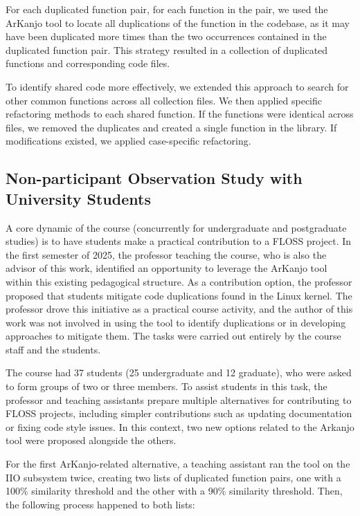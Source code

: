 For each duplicated function pair, for each function in the pair, we used the ArKanjo tool to locate all duplications of the function in the codebase, as it may have been duplicated more times than the two occurrences contained in the duplicated function pair. 
This strategy resulted in a collection of duplicated functions and corresponding code files.

To identify shared code more effectively, we extended this approach to search for other common 
functions across all collection files. We then applied specific refactoring methods to each shared 
function. If the functions were identical across files, we removed the duplicates and created a single 
function in the library. If modifications existed, we applied case-specific refactoring.

\subsection{Non-participant Observation Study with University Students}

A core dynamic of the course (concurrently for undergraduate and postgraduate studies) is to 
have students make a practical contribution to a FLOSS project. In the first semester of 
2025, the professor teaching the course, who is also the advisor of this work, identified an 
opportunity to leverage the ArKanjo tool within this existing pedagogical structure. 
As a contribution option, the professor proposed that students mitigate code duplications found 
in the Linux kernel. The professor drove this initiative as a practical course activity, 
and the author of this work was not involved in using the tool to identify duplications or 
in developing approaches to mitigate them. The tasks were carried out entirely by the course 
staff and the students.

The course had 37 students (25 undergraduate and 12 graduate), who were asked to form groups of
two or three members. To assist students in this task, the professor and teaching assistants prepare multiple alternatives for contributing to FLOSS projects, including simpler contributions such as updating documentation or fixing code style issues. In this context, two new options related to the
Arkanjo tool were proposed alongside the others.

For the first ArKanjo-related alternative, a teaching assistant ran the tool on the IIO subsystem twice, creating two lists of duplicated function pairs, one with a 100\% similarity threshold and the other with a 90\% similarity threshold. Then, the following process happened to both lists:

